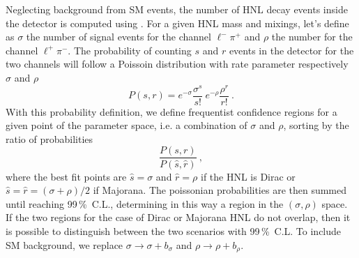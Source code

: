 Neglecting background from SM events, the number of HNL decay events inside the detector is computed %
using .
For a given HNL mass and mixings, let's define as $\sigma$ the number of signal events for the channel $\ell^- \pi^+$ %
and $\rho$ the number for the channel $\ell^+ \pi^-$.
The probability of counting $s$ and $r$ events in the detector for the two channels %
will follow a Poissoin distribution with rate parameter respectively $\sigma$ and $\rho$
\[
	P(s, r) = e^{-\sigma} \frac{\sigma^s}{s!}\ e^{-\rho} \frac{\rho^r}{r!}\ .
\]
With this probability definition, we define frequentist confidence regions %
for a given point of the parameter space, i.e. a combination of $\sigma$ and $\rho$, %
sorting by the ratio of probabilities~\cite{Feldman:1997qc} %
\[
	\frac{P(s, r)}{P(\hat{s}, \hat{r})}\ ,
\]
where the best fit points are $\hat{s} = \sigma$ and $\hat{r} = \rho$ if the HNL is Dirac %
or $\hat{s} = \hat{r} = (\sigma + \rho)/2$ if Majorana.
The poissonian probabilities are then summed until reaching 99\,\%\ C.L., %
determining in this way a region in the $(\sigma, \rho)$ space.
If the two regions for the case of Dirac or Majorana HNL do not overlap, %
then it is possible to distinguish between the two scenarios with 99\,\%\ C.L.
To include SM background, we replace $\sigma \to \sigma + b_\sigma$ and $\rho \to \rho + b_\rho$.

